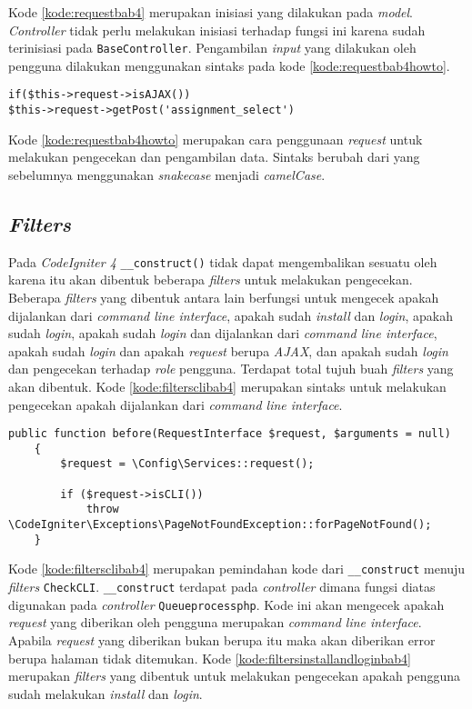 Kode \ref{kode:requestbab4} merupakan inisiasi yang dilakukan pada \textit{model}. \textit{Controller} tidak perlu melakukan inisiasi terhadap fungsi ini karena sudah terinisiasi pada \texttt{BaseController}. Pengambilan \textit{input} yang dilakukan oleh pengguna dilakukan menggunakan sintaks pada kode \ref{kode:requestbab4howto}.

\begin{lstlisting}[caption=Perancangan penggunaan \textit{request}, label=kode:requestbab4howto]
if($this->request->isAJAX())
$this->request->getPost('assignment_select')
\end{lstlisting}

Kode \ref{kode:requestbab4howto} merupakan cara penggunaan \textit{request} untuk melakukan pengecekan dan pengambilan data. Sintaks berubah dari yang sebelumnya menggunakan \textit{snakecase} menjadi \textit{camelCase}.

\subsection{\textit{Filters}}
Pada \textit{CodeIgniter 4} \texttt{\_\_construct()} tidak dapat mengembalikan sesuatu oleh karena itu akan dibentuk beberapa \textit{filters} untuk melakukan pengecekan. Beberapa \textit{filters} yang dibentuk antara lain berfungsi untuk mengecek apakah dijalankan dari \textit{command line interface}, apakah sudah \textit{install} dan \textit{login}, apakah sudah \textit{login}, apakah sudah \textit{login} dan dijalankan dari \textit{command line interface}, apakah sudah \textit{login} dan apakah \textit{request} berupa \textit{AJAX}, dan apakah sudah \textit{login} dan pengecekan terhadap \textit{role} pengguna. Terdapat total tujuh buah \textit{filters} yang akan dibentuk. Kode \ref{kode:filtersclibab4} merupakan sintaks untuk melakukan pengecekan apakah dijalankan dari \textit{command line interface}.

\begin{lstlisting}[caption=Perancangan kode pada \textit{Filters} \texttt{CheckCLI.php}, label=kode:filtersclibab4]
	public function before(RequestInterface $request, $arguments = null)
    {   
        $request = \Config\Services::request();

        if ($request->isCLI())
            throw \CodeIgniter\Exceptions\PageNotFoundException::forPageNotFound();
    }
\end{lstlisting}
Kode \ref{kode:filtersclibab4} merupakan pemindahan kode dari \texttt{\_\_construct} menuju \textit{filters} \texttt{CheckCLI}.  \texttt{\_\_construct} terdapat pada \textit{controller} dimana fungsi diatas digunakan pada \textit{controller} \texttt{Queueprocessphp}. Kode ini akan mengecek apakah \textit{request} yang diberikan oleh pengguna merupakan \textit{command line interface}. Apabila \textit{request} yang diberikan bukan berupa itu maka akan diberikan error berupa halaman tidak ditemukan. Kode \ref{kode:filtersinstallandloginbab4} merupakan \textit{filters} yang dibentuk untuk melakukan pengecekan apakah pengguna sudah melakukan \textit{install} dan \textit{login}.

